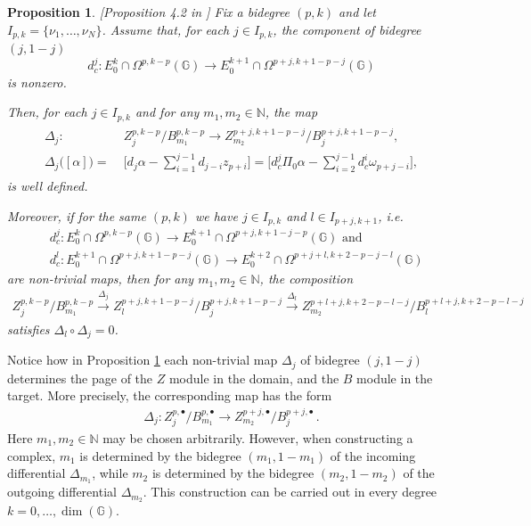 \documentclass[dvipsnames]{amsart}
\newtheorem{proposition}[theorem]{Proposition}
\theoremstyle{definition}
\theoremstyle{definition}
\numberwithin{equation}{section}
\newcommand{\N}{\mathbb{N}}
\newcommand{\G}{\mathbb{G}}
\begin{document}
\begin{proposition}\label{prop: Delta well defined}[Proposition 4.2 in \cite{tripaldi2026spectralcomplexestruncatedmulticomplexes}] Fix a bidegree $(p,k)$ and let $I_{p,k}=\{\nu_1,\ldots,\nu_N\}$. Assume that, for each $j\in I_{p,k}$, the component of bidegree $(j,1-j)$
\[
d_c^j \colon E_0^k \cap \Omega^{p,k-p}(\mathbb{G})
\longrightarrow
E_0^{k+1} \cap \Omega^{p+j,k+1-p-j}(\mathbb{G})
\]
is nonzero. 

Then, for each $j \in I_{p,k}$ and for any $m_1,m_2 \in \mathbb{N}$, the map
\begin{align}\label{the good differentials}
\begin{split}
\Delta_j \colon\;&
Z_j^{p,k-p}/B_{m_1}^{p,k-p}
\longrightarrow
Z_{m_2}^{p+j,k+1-p-j}/B_j^{p+j,k+1-p-j},\\
\Delta_j\big([\alpha]\big)
=\;&
\bigg[
d_j \alpha - \sum_{i=1}^{j-1} d_{j-i} z_{p+i}
\bigg]
=
\bigg[
d_c^j \Pi_0 \alpha - \sum_{i=2}^{j-1} d_c^i \omega_{p+j-i}
\bigg],
\end{split}
\end{align}
is well defined.



    Moreover, if for the same $(p,k)$ we have $j \in I_{p,k}$ and $l \in I_{p+j,k+1}$, i.e.
    \begin{align*}
        &d_c^j\colon E_0^k\cap\Omega^{p,k-p}(\G)\longrightarrow E_0^{k+1}\cap\Omega^{p+j,k+1-j-p}(\G)\text{ and }\\&d_c^l\colon E_0^{k+1}\cap\Omega^{p+j,k+1-p-j}(\G)\longrightarrow E_0^{k+2}\cap\Omega^{p+j+l,k+2-p-j-l}(\G)
    \end{align*}
    are non-trivial maps, then for any $m_1,m_2\in\N$, the composition
    \begin{align*}
        Z_j^{p,k-p}/B_{m_1}^{p,k-p}\xrightarrow[]{\Delta_j}Z_l^{p+j,k+1-p-j}/B_j^{p+j,k+1-p-j}\xrightarrow[]{\Delta_l} Z_{m_2}^{p+l+j,k+2-p-l-j}/B_l^{p+l+j,k+2-p-l-j}
    \end{align*}
    satisfies $\Delta_l\circ \Delta_j=0$.
\end{proposition}

    Notice how in Proposition \ref{prop: Delta well defined} each non-trivial map $\Delta_j$ of bidegree $(j,1-j)$ determines the page of the $Z$ module in the domain, and the $B$ module in the target. More precisely, the corresponding map has the form
    \begin{align*}
        \Delta_j\colon Z_j^{p,\bullet}/B_{m_1}^{p,\bullet}\longrightarrow Z_{m_2}^{p+j,\bullet}/B_j^{p+j,\bullet}\,.
    \end{align*}
    Here $m_1,m_2\in\N$ may be chosen arbitrarily. However, when constructing a complex, $m_1$ is determined by the bidegree $(m_1,1-m_1)$ of the incoming differential $\Delta_{m_1}$, while $m_2$ is determined by the bidegree $(m_2,1-m_2)$ of the outgoing differential $\Delta_{m_2}$. This construction can be carried out in every degree
$k=0,\ldots,\dim(\mathbb{G})$.
\end{document}
